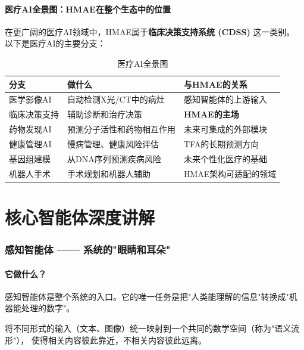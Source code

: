 \documentclass[11pt,a4paper]{ctexart}
\begin{document}
\subsection{医疗AI全景图：HMAE在整个生态中的位置}

在更广阔的医疗AI领域中，HMAE属于\textbf{临床决策支持系统 (CDSS)} 这一类别。
以下是医疗AI的主要分支：

\begin{table}[H]
\centering
\small
\begin{tabular}{lll}
\toprule
\textbf{分支} & \textbf{做什么} & \textbf{与HMAE的关系} \\
\midrule
医学影像AI & 自动检测X光/CT中的病灶 & 感知智能体的上游输入 \\
临床决策支持 & 辅助诊断和治疗决策 & \textbf{HMAE的主场} \\
药物发现AI & 预测分子活性和药物相互作用 & 未来可集成的外部模块 \\
健康管理AI & 慢病管理、健康风险评估 & TFA的长期预测方向 \\
基因组建模 & 从DNA序列预测疾病风险 & 未来个性化医疗的基础 \\
机器人手术 & 手术规划和机器人辅助 & HMAE架构可适配的领域 \\
\bottomrule
\end{tabular}
\caption{医疗AI全景图}
\end{table}

\newpage

\part{核心智能体深度讲解}

\section{感知智能体 —— 系统的"眼睛和耳朵"}

\subsection{它做什么？}

感知智能体是整个系统的入口。它的唯一任务是把"人类能理解的信息"转换成"机器能处理的数字"。

\begin{defbox}[感知智能体的任务]
将不同形式的输入（文本、图像）统一映射到一个共同的数学空间（称为"语义流形"），
使得相关内容彼此靠近，不相关内容彼此远离。
\end{defbox}
\end{document}
